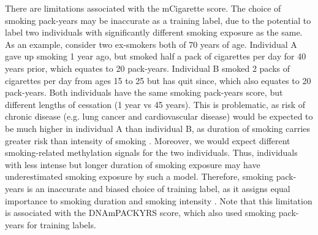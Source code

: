\documentclass{article}
\begin{document}

There are limitations associated with the mCigarette score. The choice of smoking pack-years may be inaccurate as a training label, due to the potential to label two individuals with significantly different smoking exposure as the same. As an example, consider two ex-smokers both of 70 years of age. Individual A gave up smoking 1 year ago, but smoked half a pack of cigarettes per day for 40 years prior, which equates to 20 pack-years. Individual B smoked 2 packs of cigarettes per day from ages 15 to 25 but has quit since, which also equates to 20 pack-years. Both individuals have the same smoking pack-years score, but different lengths of cessation (1 year vs 45 years). This is problematic, as risk of chronic disease (e.g. lung cancer and cardiovascular disease) would be expected to be much higher in individual A than individual B, as duration of smoking carries greater risk than intensity of smoking \cite{remen2018risk, flanders2003lung, lubin2006cigarette, doll1978cigarette}. Moreover, we would expect different smoking-related methylation signals for the two individuals. Thus, individuals with less intense but longer duration of smoking exposure may have underestimated smoking exposure by such a model. Therefore, smoking pack-years is an inaccurate and biased choice of training label, as it assigns equal importance to smoking duration and smoking intensity \cite{potter2024pack}. Note that this limitation is associated with the DNAmPACKYRS score, which also used smoking pack-years for training labels. 

\end{document}
